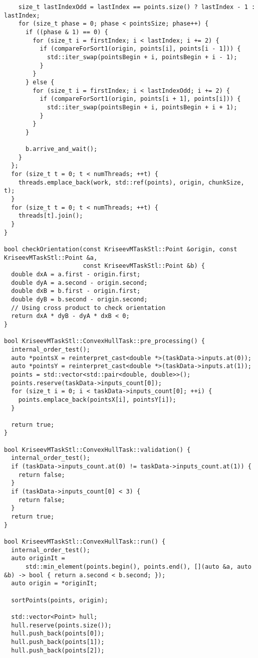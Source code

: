 \documentclass[a4paper,12pt]{article}
\begin{document}
\begin{lstlisting}
    size_t lastIndexOdd = lastIndex == points.size() ? lastIndex - 1 : lastIndex;
    for (size_t phase = 0; phase < pointsSize; phase++) {
      if ((phase & 1) == 0) {
        for (size_t i = firstIndex; i < lastIndex; i += 2) {
          if (compareForSort1(origin, points[i], points[i - 1])) {
            std::iter_swap(pointsBegin + i, pointsBegin + i - 1);
          }
        }
      } else {
        for (size_t i = firstIndex; i < lastIndexOdd; i += 2) {
          if (compareForSort1(origin, points[i + 1], points[i])) {
            std::iter_swap(pointsBegin + i, pointsBegin + i + 1);
          }
        }
      }

      b.arrive_and_wait();
    }
  };
  for (size_t t = 0; t < numThreads; ++t) {
    threads.emplace_back(work, std::ref(points), origin, chunkSize, t);
  }
  for (size_t t = 0; t < numThreads; ++t) {
    threads[t].join();
  }
}

bool checkOrientation(const KriseevMTaskStl::Point &origin, const KriseevMTaskStl::Point &a,
                      const KriseevMTaskStl::Point &b) {
  double dxA = a.first - origin.first;
  double dyA = a.second - origin.second;
  double dxB = b.first - origin.first;
  double dyB = b.second - origin.second;
  // Using cross product to check orientation
  return dxA * dyB - dyA * dxB < 0;
}

bool KriseevMTaskStl::ConvexHullTask::pre_processing() {
  internal_order_test();
  auto *pointsX = reinterpret_cast<double *>(taskData->inputs.at(0));
  auto *pointsY = reinterpret_cast<double *>(taskData->inputs.at(1));
  points = std::vector<std::pair<double, double>>();
  points.reserve(taskData->inputs_count[0]);
  for (size_t i = 0; i < taskData->inputs_count[0]; ++i) {
    points.emplace_back(pointsX[i], pointsY[i]);
  }

  return true;
}

bool KriseevMTaskStl::ConvexHullTask::validation() {
  internal_order_test();
  if (taskData->inputs_count.at(0) != taskData->inputs_count.at(1)) {
    return false;
  }
  if (taskData->inputs_count[0] < 3) {
    return false;
  }
  return true;
}

bool KriseevMTaskStl::ConvexHullTask::run() {
  internal_order_test();
  auto originIt =
      std::min_element(points.begin(), points.end(), [](auto &a, auto &b) -> bool { return a.second < b.second; });
  auto origin = *originIt;

  sortPoints(points, origin);

  std::vector<Point> hull;
  hull.reserve(points.size());
  hull.push_back(points[0]);
  hull.push_back(points[1]);
  hull.push_back(points[2]);


\end{lstlisting}
\end{document}
